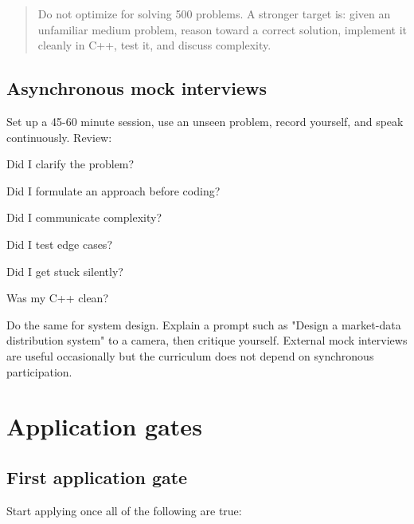 \documentclass[11pt,letterpaper]{article}
\begin{document}
\begin{quote}
Do not optimize for solving 500 problems. A stronger target is: given an unfamiliar medium problem, reason toward a correct solution, implement it cleanly in C++, test it, and discuss complexity.
\end{quote}

\subsection*{Asynchronous mock interviews}

Set up a 45-60 minute session, use an unseen problem, record yourself, and speak continuously. Review:

\begin{topics}

\item Did I clarify the problem?

\item Did I formulate an approach before coding?

\item Did I communicate complexity?

\item Did I test edge cases?

\item Did I get stuck silently?

\item Was my C++ clean?

\end{topics}

Do the same for system design. Explain a prompt such as "Design a market-data distribution system" to a camera, then critique yourself. External mock interviews are useful occasionally but the curriculum does not depend on synchronous participation.

\section{Application gates}\label{sec:15}

\subsection*{First application gate}

Start applying once all of the following are true:
\end{document}
